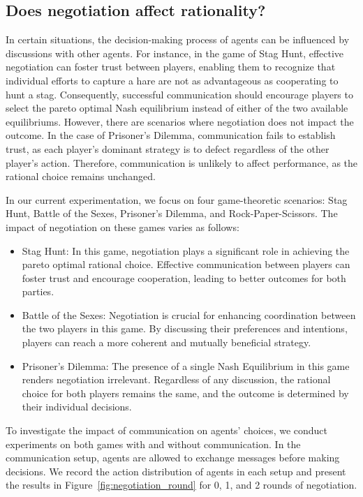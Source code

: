 \subsection{Does negotiation affect rationality?}
In certain situations, the decision-making process of agents can be influenced by discussions with other agents. For instance, in the game of Stag Hunt, effective negotiation can foster trust between players, enabling them to recognize that individual efforts to capture a hare are not as advantageous as cooperating to hunt a stag. Consequently, successful communication should encourage players to select the pareto optimal Nash equilibrium instead of either of the two available equilibriums. However, there are scenarios where negotiation does not impact the outcome. In the case of Prisoner's Dilemma, communication fails to establish trust, as each player's dominant strategy is to defect regardless of the other player's action. Therefore, communication is unlikely to affect performance, as the rational choice remains unchanged. 

In our current experimentation, we focus on four game-theoretic scenarios: Stag Hunt, Battle of the Sexes, Prisoner's Dilemma, and Rock-Paper-Scissors. The impact of negotiation on these games varies as follows:
\begin{itemize}
    \item Stag Hunt: In this game, negotiation plays a significant role in achieving the pareto optimal rational choice. Effective communication between players can foster trust and encourage cooperation, leading to better outcomes for both parties.
    \item Battle of the Sexes: Negotiation is crucial for enhancing coordination between the two players in this game. By discussing their preferences and intentions, players can reach a more coherent and mutually beneficial strategy.
    \item Prisoner's Dilemma: The presence of a single Nash Equilibrium in this game renders negotiation irrelevant. Regardless of any discussion, the rational choice for both players remains the same, and the outcome is determined by their individual decisions.
\end{itemize}

To investigate the impact of communication on agents' choices, we conduct experiments on both games with and without communication. In the communication setup, agents are allowed to exchange messages before making decisions. We record the action distribution of agents in each setup and present the results in Figure~\ref{fig:negotiation_round} for 0, 1, and 2 rounds of negotiation.

